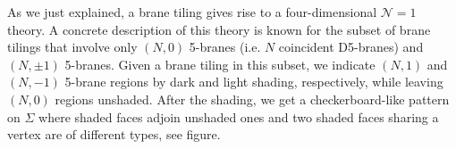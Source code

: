 As we just explained, a brane tiling gives rise to a four-dimensional
$\mathcal{N}=1$ theory. A concrete description of this theory is
known for the subset of brane tilings that involve only $\left( N,0 \right)$
5-branes (i.e. $N$ coincident D5-branes) and $\left( N,\pm1 \right)$
5-branes. Given a brane tiling in this subset, we indicate $\left( N,1 \right)$
and $\left( N,-1 \right)$ 5-brane regions by dark and light shading,
respectively, while leaving $\left( N,0 \right)$ regions unshaded.
After the shading, we get a checkerboard-like pattern on $\Sigma$
where shaded faces adjoin unshaded ones and two shaded faces sharing
a vertex are of different types, see figure. 


\begin{figure}
\centering
  \subfloat[\label{}]{  }
  \subfloat[\label{}]{
    \begin{tikzpicture}[scale=1] %
        \def\width{3cm}
        \def\height{2cm}
        \def\sep{1cm}
        
        \draw[color=olive!80] (0,0) rectangle (\width,\height);
        
        \node[node, minimum size=7pt] at (0.3cm,0.7cm-\sep) {};
        \node[node, minimum size=7pt] at (0.3cm,0.7cm) {};    %
        \node[node, minimum size=7pt] at (0.3cm,0.7cm+\sep) {};
        
    \end{tikzpicture}    
    }
  \caption{}
  \label{fig:tilings_quiverdiagram}
\end{figure}


